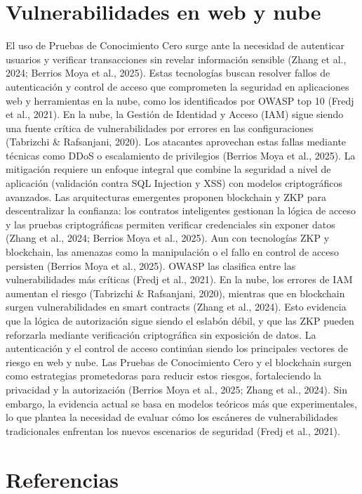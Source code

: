 \documentclass[conference]{IEEEtran}
\begin{document}
\section{Vulnerabilidades en web y nube}
El uso de Pruebas de Conocimiento Cero  surge ante la necesidad de autenticar usuarios y verificar transacciones sin revelar información sensible (Zhang et al., 2024; Berrios Moya et al., 2025). Estas tecnologías buscan resolver fallos de autenticación y control de acceso que comprometen la seguridad en aplicaciones web y herramientas en la nube, como los identificados por OWASP top 10 (Fredj et al., 2021).
En la nube, la Gestión de Identidad y Acceso (IAM) sigue siendo una fuente crítica de vulnerabilidades por errores en las configuraciones (Tabrizchi & Rafsanjani, 2020). Los atacantes aprovechan estas fallas mediante técnicas como DDoS o escalamiento de privilegios (Berrios Moya et al., 2025). La mitigación requiere un enfoque integral que combine la seguridad a nivel de aplicación (validación contra SQL Injection y XSS) con modelos criptográficos avanzados.
Las arquitecturas emergentes proponen blockchain y ZKP para descentralizar la confianza: los contratos inteligentes gestionan la lógica de acceso y las pruebas criptográficas permiten verificar credenciales sin exponer datos (Zhang et al., 2024; Berrios Moya et al., 2025).
Aun con tecnologías ZKP y blockchain, las amenazas como la manipulación o el fallo en control de acceso persisten (Berrios Moya et al., 2025). OWASP las clasifica entre las vulnerabilidades más críticas (Fredj et al., 2021). En la nube, los errores de IAM aumentan el riesgo (Tabrizchi & Rafsanjani, 2020), mientras que en blockchain surgen vulnerabilidades en smart contracts (Zhang et al., 2024). Esto evidencia que la lógica de autorización sigue siendo el eslabón débil, y que las ZKP pueden reforzarla mediante verificación criptográfica sin exposición de datos.
La autenticación y el control de acceso continúan siendo los principales vectores de riesgo en web y nube. Las Pruebas de Conocimiento Cero y el blockchain surgen como estrategias prometedoras para reducir estos riesgos, fortaleciendo la privacidad y la autorización (Berrios Moya et al., 2025; Zhang et al., 2024). Sin embargo, la evidencia actual se basa en modelos teóricos más que experimentales, lo que plantea la necesidad de evaluar cómo los escáneres de vulnerabilidades tradicionales enfrentan los nuevos escenarios de seguridad (Fredj et al., 2021).


\section*{Referencias}
\end{document}
